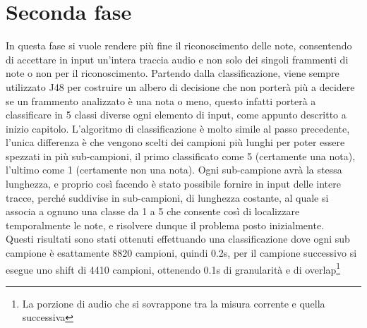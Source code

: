 \section{Seconda fase}
In questa fase si vuole rendere più fine il riconoscimento delle note, consentendo di accettare in input un'intera traccia audio e non solo dei singoli frammenti di note o non per il riconoscimento. Partendo dalla classificazione, viene sempre utilizzato J48 per costruire un albero di decisione che non porterà più a decidere se un frammento analizzato è una nota o meno, questo infatti porterà a classificare in 5 classi diverse ogni elemento di input, come appunto descritto a inizio capitolo. L'algoritmo di classificazione è molto simile al passo precedente, l'unica differenza è che vengono scelti dei campioni più lunghi per poter essere spezzati in più sub-campioni, il primo classificato come 5 (certamente una nota), l'ultimo come 1 (certamente non una nota). Ogni sub-campione avrà la stessa lunghezza, e proprio così facendo è stato possibile fornire in input delle intere tracce, perché suddivise in sub-campioni, di lunghezza costante, al quale si associa a ognuno una classe da 1 a 5 che consente così di localizzare temporalmente le note, e risolvere dunque il problema posto inizialmente.\\

Questi risultati sono stati ottenuti effettuando una classificazione dove ogni sub campione è esattamente 8820 campioni, quindi 0.2s, per il campione successivo si esegue uno shift di 4410 campioni, ottenendo 0.1s di granularità e di overlap\footnote{La porzione di audio che si sovrappone tra la misura corrente e quella successiva}
